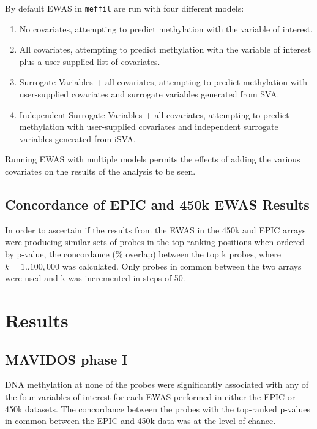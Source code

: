 \documentclass[
]{book}
\providecommand{\tightlist}{%
  \setlength{\itemsep}{0pt}\setlength{\parskip}{0pt}}
\begin{document}
By default EWAS in \texttt{meffil} are run with four different models:

\begin{enumerate}
\def\labelenumi{\arabic{enumi}.}
\tightlist
\item
  No covariates, attempting to predict methylation with the variable of interest.
\item
  All covariates, attempting to predict methylation with the variable of interest plus a user-supplied list of covariates.
\item
  Surrogate Variables + all covariates, attempting to predict methylation with user-supplied covariates and surrogate variables generated from SVA.
\item
  Independent Surrogate Variables + all covariates, attempting to predict methylation with user-supplied covariates and independent surrogate variables generated from iSVA.
\end{enumerate}

Running EWAS with multiple models permits the effects of adding the various covariates on the results of the analysis to be seen.

\hypertarget{concordance-of-epic-and-450k-ewas-results}{%
\subsection{Concordance of EPIC and 450k EWAS Results}\label{concordance-of-epic-and-450k-ewas-results}}

In order to ascertain if the results from the EWAS in the 450k and EPIC arrays were producing similar sets of probes in the top ranking positions when ordered by p-value, the concordance (\% overlap) between the top k probes, where \(k = 1 .. 100,000\) was calculated.
Only probes in common between the two arrays were used and k was incremented in steps of 50.

\hypertarget{results}{%
\section{Results}\label{results}}

\hypertarget{mavidos-phase-i}{%
\subsection{MAVIDOS phase I}\label{mavidos-phase-i}}

DNA methylation at none of the probes were significantly associated with any of the four variables of interest for each EWAS performed in either the EPIC or 450k datasets.
The concordance between the probes with the top-ranked p-values in common between the EPIC and 450k data was at the level of chance.
\end{document}
